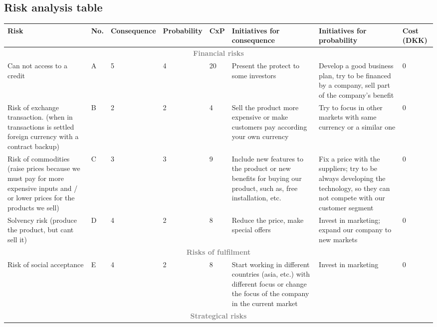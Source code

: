 \begin{landscape}
\section{Risk analysis table}
\label{riskapp}
\def\arraystretch{1.5}
\begin{table}[h!]
\centering
\scriptsize
\begin{tabular}[0.8\textswidth]{|p{5cm} |p{1cm} |p{2cm} |p{2cm} |p{1cm} |p{2.8cm} |p{2.8cm} |p{2cm}|}
\hline
Risk 										&No.& Consequence	& Probability	& CxP	& Initiatives \newline for consequence	& Initiatives \newline for probability	& 	Cost (DKK) \\
\hline
\multicolumn{8}{|c|}{\normalsize{\textcolor{gray}{\textbf{Financial risks}}}}\\
\hline
Can not access to a credit					& A	& 5				&	4			& 20	& Present the protect to some investors	& Develop a good business plan, try to be financed by a company, sell part of the company's benefit	& 0\\
\hline
Risk of exchange transaction. 
(when in transactions is settled 
foreign currency with a contract backup)	& B	& 2				& 2				&  4	& Sell the product more expensive or make customers pay according your own currency
 &	Try to focus in other markets with same currency or a similar one &  0\\
\hline
Risk of commodities (raise prices because 
we  must pay for more expensive  inputs and
 / or lower prices for the products we sell)& C	& 3				& 3				& 9		& Include new features to the product or new benefits for buying our product, such as, free installation, etc.
 & Fix a price with the suppliers; try to be always developing the technology, so they can not compete with our customer segment & 0 \\
\hline
Solvency risk (produce the product, but cant sell it)	& D	& 4				& 2				& 8		& Reduce the price, make special offers & Invest in marketing; expand our company to new markets & 0 \\
\hline
\multicolumn{8}{|c|}{\normalsize{\textcolor{gray}{\textbf{Risks of fulfilment}}}}\\
\hline
Risk of social acceptance & E & 4 &  2 & 8 & Start working in different countries (asia, etc.) with different focus or change the focus of the company in the current market
& Invest in marketing &0 \\
\hline
\multicolumn{8}{|c|}{\normalsize{\textcolor{gray}{\textbf{Strategical risks}}}}\\

\end{tabular}
\end{table}
\end{landscape}

